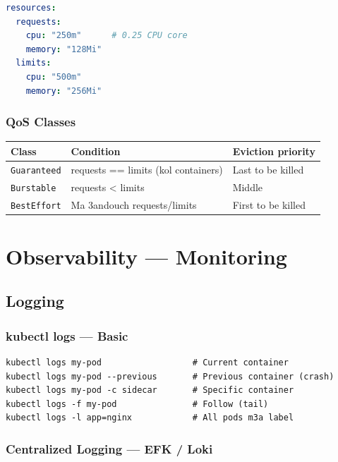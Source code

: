 \documentclass[11pt,a4paper]{book}
\begin{document}
\begin{lstlisting}[language=yaml]
resources:
  requests:
    cpu: "250m"      # 0.25 CPU core
    memory: "128Mi"
  limits:
    cpu: "500m"
    memory: "256Mi"
\end{lstlisting}

\subsection{QoS Classes}

\begin{longtable}{L{3cm}L{4cm}L{5cm}}
\toprule
\textbf{Class} & \textbf{Condition} & \textbf{Eviction priority} \\
\midrule
\texttt{Guaranteed} & requests == limits (kol containers) & Last to be killed \\
\texttt{Burstable} & requests < limits & Middle \\
\texttt{BestEffort} & Ma 3andouch requests/limits & First to be killed \\
\bottomrule
\end{longtable}

\cleardoublepage

\chapter{Observability --- Monitoring}

\section{Logging}

\subsection{kubectl logs --- Basic}

\begin{lstlisting}
kubectl logs my-pod                  # Current container
kubectl logs my-pod --previous       # Previous container (crash)
kubectl logs my-pod -c sidecar       # Specific container
kubectl logs -f my-pod               # Follow (tail)
kubectl logs -l app=nginx            # All pods m3a label
\end{lstlisting}

\subsection{Centralized Logging --- EFK / Loki}
\end{document}
